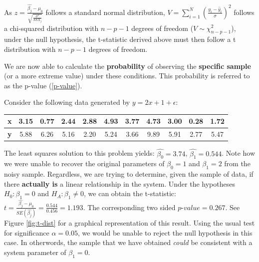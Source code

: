 \documentclass{article}
\begin{document}
As $z = \frac{\hat{\beta_j} - \mu_0}{\sqrt{\frac{\sigma^2}{SSX_j}}}$ follows a standard normal distribution, $V = \sum\limits_{i=1}^{N}(\frac{y_i - \hat{y}_i}{\sigma})^2$ follows a chi-squared distribution with $n-p-1$ degrees of freedom ($V \sim \chi^2_{n-p-1}$), under the null hypothesis, the t-statistic derived above must then follow a t distribution with $n-p-1$ degrees of freedom.

We are now able to calculate the \textbf{probability} of observing the \textbf{specific sample} (or a more extreme value) under these conditions. This probability is referred to as the p-value (\ref{p-value}).

Consider the following data generated by $y = 2x + 1 + \epsilon$:

\begin{center}
  \begin{tabular}{ | l | c | c | c | c | c | c | c | c | c | c |}
    \hline
    \textbf{x} & 3.15&0.77&2.44&2.88&4.93&3.77&4.73&3.00&0.28&1.72\\ \hline
    \textbf{y} & 5.88&6.26&5.16&2.20&5.24&3.66&9.89&5.91&2.77&5.47\\ \hline
  \end{tabular}
\end{center}

The least squares solution to this problem yields: $\hat{\beta_0} = 3.74$, $\hat{\beta_1} = 0.544$. Note how we were unable to recover the original parameters of $\beta_0 = 1$ and $\beta_1 = 2$ from the noisy sample. Regardless, we are trying to determine, given the sample of data, if there \textbf{actually is} a linear relationship in the system. Under the hypotheses $H_0: \beta_1 = 0$ and $H_A: \beta_1 \neq 0$, we can obtain the t-statistic: $t = \frac{\hat{\beta_j} - \mu_0}{SE(\hat{\beta_j})} = \frac{0.544}{0.456} = 1.193$. The corresponding two sided $\textit{p-value}  = 0.267$. See Figure \ref{fig:t-dist} for a graphical representation of this result. Using the usual test for significance $\alpha = 0.05$, we would be unable to reject the null hypothesis in this case. In otherwords, the sample that we have obtained \textit{could} be consistent with a system parameter of $\beta_1 = 0$.
\end{document}
